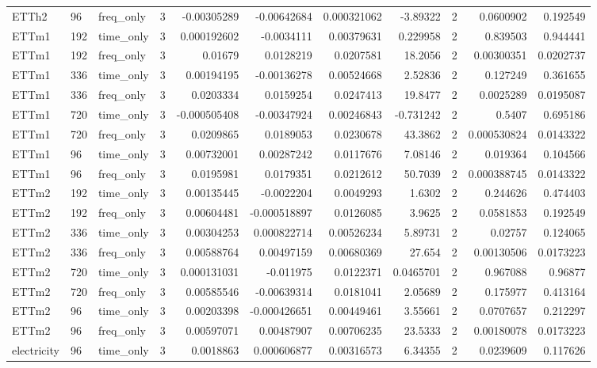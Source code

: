 \begin{longtable}{lllrrrrrrrr}
ETTh2 & 96 & freq\_only & 3 & -0.00305289 & -0.00642684 & 0.000321062 & -3.89322 & 2 & 0.0600902 & 0.192549 \\
ETTm1 & 192 & time\_only & 3 & 0.000192602 & -0.0034111 & 0.00379631 & 0.229958 & 2 & 0.839503 & 0.944441 \\
ETTm1 & 192 & freq\_only & 3 & 0.01679 & 0.0128219 & 0.0207581 & 18.2056 & 2 & 0.00300351 & 0.0202737 \\
ETTm1 & 336 & time\_only & 3 & 0.00194195 & -0.00136278 & 0.00524668 & 2.52836 & 2 & 0.127249 & 0.361655 \\
ETTm1 & 336 & freq\_only & 3 & 0.0203334 & 0.0159254 & 0.0247413 & 19.8477 & 2 & 0.0025289 & 0.0195087 \\
ETTm1 & 720 & time\_only & 3 & -0.000505408 & -0.00347924 & 0.00246843 & -0.731242 & 2 & 0.5407 & 0.695186 \\
ETTm1 & 720 & freq\_only & 3 & 0.0209865 & 0.0189053 & 0.0230678 & 43.3862 & 2 & 0.000530824 & 0.0143322 \\
ETTm1 & 96 & time\_only & 3 & 0.00732001 & 0.00287242 & 0.0117676 & 7.08146 & 2 & 0.019364 & 0.104566 \\
ETTm1 & 96 & freq\_only & 3 & 0.0195981 & 0.0179351 & 0.0212612 & 50.7039 & 2 & 0.000388745 & 0.0143322 \\
ETTm2 & 192 & time\_only & 3 & 0.00135445 & -0.0022204 & 0.0049293 & 1.6302 & 2 & 0.244626 & 0.474403 \\
ETTm2 & 192 & freq\_only & 3 & 0.00604481 & -0.000518897 & 0.0126085 & 3.9625 & 2 & 0.0581853 & 0.192549 \\
ETTm2 & 336 & time\_only & 3 & 0.00304253 & 0.000822714 & 0.00526234 & 5.89731 & 2 & 0.02757 & 0.124065 \\
ETTm2 & 336 & freq\_only & 3 & 0.00588764 & 0.00497159 & 0.00680369 & 27.654 & 2 & 0.00130506 & 0.0173223 \\
ETTm2 & 720 & time\_only & 3 & 0.000131031 & -0.011975 & 0.0122371 & 0.0465701 & 2 & 0.967088 & 0.96877 \\
ETTm2 & 720 & freq\_only & 3 & 0.00585546 & -0.00639314 & 0.0181041 & 2.05689 & 2 & 0.175977 & 0.413164 \\
ETTm2 & 96 & time\_only & 3 & 0.00203398 & -0.000426651 & 0.00449461 & 3.55661 & 2 & 0.0707657 & 0.212297 \\
ETTm2 & 96 & freq\_only & 3 & 0.00597071 & 0.00487907 & 0.00706235 & 23.5333 & 2 & 0.00180078 & 0.0173223 \\
electricity & 96 & time\_only & 3 & 0.0018863 & 0.000606877 & 0.00316573 & 6.34355 & 2 & 0.0239609 & 0.117626 \\

\end{longtable}
